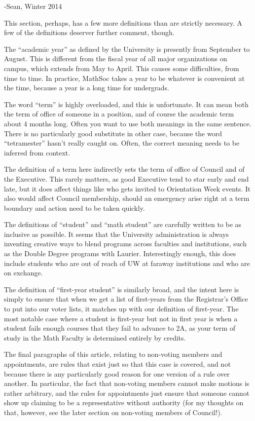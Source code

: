-Sean, Winter 2014


This section, perhaps, has a few more definitions than are strictly necessary. A
few of the definitions deserver further comment, though.

The ``academic year'' as defined by the University is presently from September
to August. This is different from the fiscal year of all major organizations on
campus, which extends from May to April. This causes some difficulties, from
time to time. In practice, MathSoc takes a year to be whatever is convenient at
the time, because a year is a long time for undergrads.

The word ``term'' is highly overloaded, and this is unfortunate. It can mean
both the term of office of someone in a position, and of course the academic
term about 4 months long. Often you want to use both meanings in the same
sentence. There is no particularly good substitute in other case, because the
word ``tetramester'' hasn't really caught on. Often, the correct meaning needs
to be inferred from context.

The definition of a term here indirectly sets the term of office of Council and
of the Executive. This rarely matters, as good Executive tend to star early and
end late, but it does affect things like who gets invited to Orientation Week
events. It also would affect Council membership, should an emergency arise right
at a term boundary and action need to be taken quickly.

The definitions of ``student'' and ``math student'' are carefully written to be
as inclusive as possible. It seems that the University administration is always
inventing creative ways to blend programs across faculties and institutions,
such as the Double Degree programs with Laurier. Interestingly enough, this
does include students who are out of reach of UW at faraway institutions and who
are on exchange.

The definition of ``first-year student'' is similarly broad, and the intent here
is simply to ensure that when we get a list of first-years from the Registrar's
Office to put into our voter lists, it matches up with our definition of
first-year. The most notable case where a student is first-year but not in first
year is when a student fails enough courses that they fail to advance to 2A, as
your term of study in the Math Faculty is determined entirely by credits.

The final paragraphs of this article, relating to non-voting members and
appointments, are rules that exist just so that this case is covered, and not
because there is any particularly good reason for one version of a rule over
another. In particular, the fact that non-voting members cannot make motions is
rather arbitrary, and the rules for appointments just ensure that someone cannot
show up claiming to be a representative without authority (for my thoughts on
that, however, see the later section on non-voting members of Council!).

